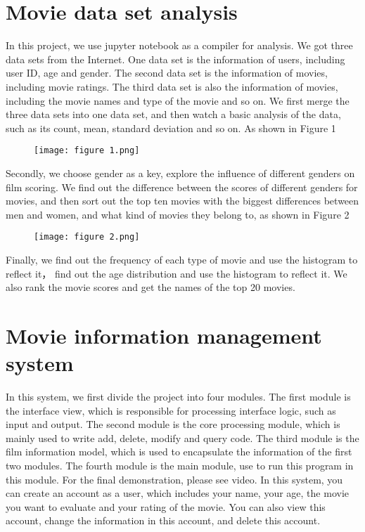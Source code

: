 \documentclass[conference]{IEEEtran}
\begin{document}
\section{Movie data set analysis}
In this project, we use jupyter notebook as a compiler for analysis. We got three data sets from the Internet. One data set is the information of users, including user ID, age and gender. The second data set is the information of movies, including movie ratings. The third data set is also the information of movies, including the movie names and type of the movie and so on. We first merge the three data sets into one data set, and then watch a basic analysis of the data, such as its count, mean, standard deviation and so on. As shown in Figure 1
\begin{figure}[H] %
\centering %
\texttt{[image: figure 1.png]} %
\caption{} %
\end{figure}
Secondly, we choose gender as a key, explore the influence of different genders on film scoring. We find out the difference between the scores of different genders for movies, and then sort out the top ten movies with the biggest differences between men and women, and what kind of movies they belong to, as shown in Figure 2
\begin{figure}[H] %
\centering %
\texttt{[image: figure 2.png]} %
\caption{} %
\end{figure}
Finally, we find out the frequency of each type of movie and use the histogram to reflect it， find out the age distribution and use the histogram to reflect it. We also rank the movie scores and get the names of the top 20 movies.
\section{Movie information management system}
In this system, we first divide the project into four modules. The first module is the interface view, which is responsible for processing interface logic, such as input and output. The second module is the core processing module, which is mainly used to write add, delete, modify and query code. The third module is the film information model, which is used to encapsulate the information of the first two modules. The fourth module is the main module, use to run this program in this module.
For the final demonstration, please see video. In this system, you can create an account as a user, which includes your name, your age, the movie you want to evaluate and your rating of the movie. You can also view this account, change the information in this account, and delete this account.
\end{document}
